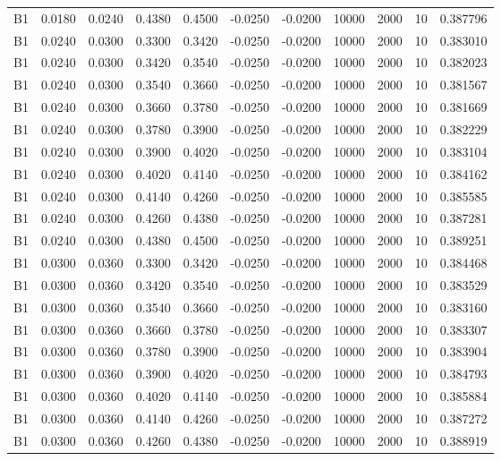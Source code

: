 \documentclass{article}
\begin{document}
\begin{longtable}{l r r r r r r r r r l}
B1 & 0.0180 & 0.0240 & 0.4380 & 0.4500 & -0.0250 & -0.0200 & 10000 & 2000 & 10 & 0.387796 \\
B1 & 0.0240 & 0.0300 & 0.3300 & 0.3420 & -0.0250 & -0.0200 & 10000 & 2000 & 10 & 0.383010 \\
B1 & 0.0240 & 0.0300 & 0.3420 & 0.3540 & -0.0250 & -0.0200 & 10000 & 2000 & 10 & 0.382023 \\
B1 & 0.0240 & 0.0300 & 0.3540 & 0.3660 & -0.0250 & -0.0200 & 10000 & 2000 & 10 & 0.381567 \\
B1 & 0.0240 & 0.0300 & 0.3660 & 0.3780 & -0.0250 & -0.0200 & 10000 & 2000 & 10 & 0.381669 \\
B1 & 0.0240 & 0.0300 & 0.3780 & 0.3900 & -0.0250 & -0.0200 & 10000 & 2000 & 10 & 0.382229 \\
B1 & 0.0240 & 0.0300 & 0.3900 & 0.4020 & -0.0250 & -0.0200 & 10000 & 2000 & 10 & 0.383104 \\
B1 & 0.0240 & 0.0300 & 0.4020 & 0.4140 & -0.0250 & -0.0200 & 10000 & 2000 & 10 & 0.384162 \\
B1 & 0.0240 & 0.0300 & 0.4140 & 0.4260 & -0.0250 & -0.0200 & 10000 & 2000 & 10 & 0.385585 \\
B1 & 0.0240 & 0.0300 & 0.4260 & 0.4380 & -0.0250 & -0.0200 & 10000 & 2000 & 10 & 0.387281 \\
B1 & 0.0240 & 0.0300 & 0.4380 & 0.4500 & -0.0250 & -0.0200 & 10000 & 2000 & 10 & 0.389251 \\
B1 & 0.0300 & 0.0360 & 0.3300 & 0.3420 & -0.0250 & -0.0200 & 10000 & 2000 & 10 & 0.384468 \\
B1 & 0.0300 & 0.0360 & 0.3420 & 0.3540 & -0.0250 & -0.0200 & 10000 & 2000 & 10 & 0.383529 \\
B1 & 0.0300 & 0.0360 & 0.3540 & 0.3660 & -0.0250 & -0.0200 & 10000 & 2000 & 10 & 0.383160 \\
B1 & 0.0300 & 0.0360 & 0.3660 & 0.3780 & -0.0250 & -0.0200 & 10000 & 2000 & 10 & 0.383307 \\
B1 & 0.0300 & 0.0360 & 0.3780 & 0.3900 & -0.0250 & -0.0200 & 10000 & 2000 & 10 & 0.383904 \\
B1 & 0.0300 & 0.0360 & 0.3900 & 0.4020 & -0.0250 & -0.0200 & 10000 & 2000 & 10 & 0.384793 \\
B1 & 0.0300 & 0.0360 & 0.4020 & 0.4140 & -0.0250 & -0.0200 & 10000 & 2000 & 10 & 0.385884 \\
B1 & 0.0300 & 0.0360 & 0.4140 & 0.4260 & -0.0250 & -0.0200 & 10000 & 2000 & 10 & 0.387272 \\
B1 & 0.0300 & 0.0360 & 0.4260 & 0.4380 & -0.0250 & -0.0200 & 10000 & 2000 & 10 & 0.388919 \\

\end{longtable}
\end{document}
